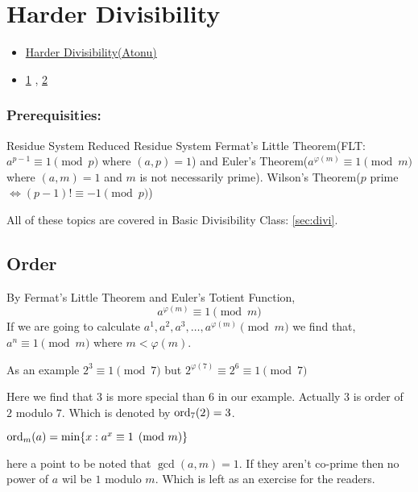 \chapter{Harder Divisibility}%
\begin{linkb}
   \begin{itemize}
        \item \href{https://www.youtube.com/watch?v=kf_0msAOTMc}{Harder Divisibility(Atonu)} 
        \item \href{https://drive.google.com/file/d/1ZURQO2KSR9aaeaVyalL7GNuVBYhOGswB/view?usp=sharing}{1} , 
			\href{https://drive.google.com/file/d/1QHrhEnmAzimZjt-8k_T8AJrX3KiRSm73/view?usp=sharing}{2} 
   \end{itemize}
\end{linkb}

\subsection*{Prerequisities:}
\begin{enumerate}
	\ii Residue System
	\ii Reduced Residue System
	\ii Fermat's Little Theorem(FLT: $a^{p-1}\equiv 1 \pmod p$ where $(a,p)=1$) and Euler's Theorem($a^{\varphi (m)}\equiv 1 \pmod m$ where $(a,m)=1$ and $m$ is not necessarily prime). 
	\ii Wilson's Theorem($p$ prime $\Leftrightarrow (p-1)! \equiv -1 \pmod p$)
\end{enumerate}
All of these topics are covered in Basic Divisibility Class: \autoref{sec:divi}.

\section{Order}
By Fermat's Little Theorem and Euler's Totient Function, 
$$a^{\varphi (m)}\equiv 1 \pmod m$$
If we are going to calculate
$a^1, a^2, a^3, \ldots, a^{\varphi (m)} \pmod m$ we find that, $a^n \equiv 1 \pmod m$ where $m< \varphi(m)$.

As an example $2^3 \equiv 1 \pmod 7$ but $2^{\varphi (7)} \equiv 2^6 \equiv 1 \pmod 7$

Here we find that $3$ is more special than $6$ in our example. Actually $3$ is order of $2$ modulo $7$.
Which is denoted by $\operatorname{ord}_{7}(2)=3$.

\begin{definition}[Order]
$\operatorname{ord}_{m}(a)=\min \{x:a^x\equiv 1 \pmod m \}$
\end{definition}
here a point to be noted that $\gcd (a,m)=1$.
If they aren't co-prime then no power of $a$ wil be $1$ modulo $m$.
Which is left as an exercise for the readers.

